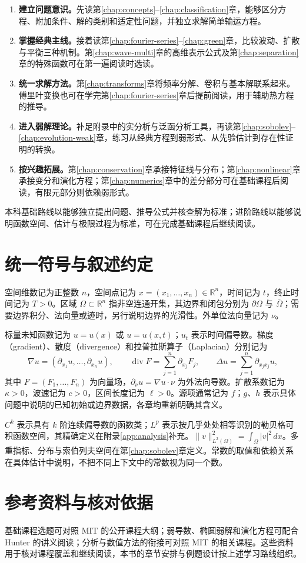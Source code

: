 \begin{enumerate}
  \item \textbf{建立问题意识。}先读第\ref{chap:concepts}--\ref{chap:classification}章，能够区分方程、附加条件、解的类别和适定性问题，并独立求解简单输运方程。
  \item \textbf{掌握经典主线。}接着读第\ref{chap:fourier-series}--\ref{chap:green}章，比较波动、扩散与平衡三种机制。第\ref{chap:wave-multi}章的高维表示公式及第\ref{chap:separation}章的特殊函数可在第一遍阅读时选读。
  \item \textbf{统一求解方法。}第\ref{chap:transforms}章将频率分解、卷积与基本解联系起来。傅里叶变换也可在学完第\ref{chap:fourier-series}章后提前阅读，用于辅助热方程的推导。
  \item \textbf{进入弱解理论。}补足附录中的实分析与泛函分析工具，再读第\ref{chap:sobolev}--\ref{chap:evolution-weak}章，练习从经典方程到弱形式、从先验估计到存在性证明的转换。
  \item \textbf{按兴趣拓展。}第\ref{chap:conservation}章承接特征线与分布；第\ref{chap:nonlinear}章承接变分和演化方程；第\ref{chap:numerics}章中的差分部分可在基础课程后阅读，有限元部分则依赖弱形式。
\end{enumerate}

本科基础路线以能够独立提出问题、推导公式并核查解为标准；进阶路线以能够说明函数空间、估计与极限过程为标准，可在完成基础课程后继续阅读。

\section{统一符号与叙述约定}

空间维数记为正整数 $n$，空间点记为 $x=(x_1,\ldots,x_n)\in\mathbb R^n$，时间记为 $t$，终止时间记为 $T>0$。区域 $\Omega\subset\mathbb R^n$ 指非空连通开集，其边界和闭包分别为 $\partial\Omega$ 与 $\overline\Omega$；需要边界积分、法向量或迹时，另行说明边界的光滑性。外单位法向量记为 $\nu$。

标量未知函数记为 $u=u(x)$ 或 $u=u(x,t)$；$u_t$ 表示时间偏导数。梯度（gradient）、散度（divergence）和拉普拉斯算子（Laplacian）分别记为
\[
  \nabla u=(\partial_{x_1}u,\ldots,\partial_{x_n}u),\qquad
  \operatorname{div}F=\sum_{j=1}^n\partial_{x_j}F_j,\qquad
  \Delta u=\sum_{j=1}^n\partial_{x_jx_j}u,
\]
其中 $F=(F_1,\ldots,F_n)$ 为向量场，$\partial_\nu u=\nabla u\cdot\nu$ 为外法向导数。扩散系数记为 $\kappa>0$，波速记为 $c>0$，区间长度记为 $\ell>0$。源项通常记为 $f$；$g$、$h$ 表示具体问题中说明的已知初始或边界数据，各章均重新明确其含义。

$C^k$ 表示具有 $k$ 阶连续偏导数的函数类；$L^p$ 表示按几乎处处相等识别的勒贝格可积函数空间，其精确定义在附录\ref{app:analysis}补充。$\|v\|_{L^2(\Omega)}^2=\int_\Omega |v|^2\,dx$。多重指标、分布与索伯列夫空间在第\ref{chap:sobolev}章定义。常数的取值和依赖关系在具体估计中说明，不把不同上下文中的常数视为同一个数。

\section{参考资料与核对依据}

基础课程选题可对照 MIT 的公开课程大纲\cite{mit152}；弱导数、椭圆弱解和演化方程可配合 Hunter 的讲义\cite{hunter}阅读；分析与数值方法的衔接可对照 MIT 的相关课程\cite{mit303}。这些资料用于核对课程覆盖和继续阅读，本书的章节安排与例题设计按上述学习路线组织。

